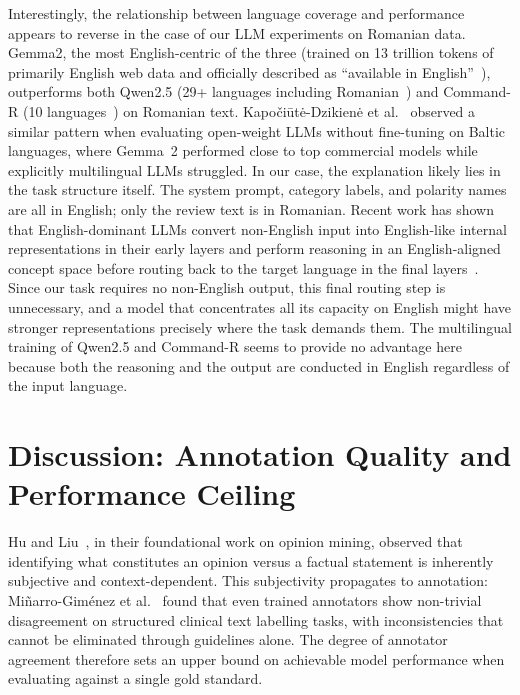 \documentclass[12pt,a4paper]{report}
\begin{document}
Interestingly, the relationship between language coverage and performance appears to reverse in the case
of our LLM experiments on Romanian data. 
Gemma2, the most English-centric of the three (trained on 13 trillion tokens of primarily English web 
data and officially described as ``available in English''~\cite{team2024gemma}), outperforms both Qwen2.5 
(29+ languages including Romanian~\cite{hui2024qwen2}) and Command-R (10 languages~\cite{cohere2024commandr}) 
on Romanian text. Kapo\v{c}i\={u}t\.{e}-Dzikien\.{e} et al.~\cite{kapociute2025baltic} observed a similar 
pattern when evaluating open-weight LLMs without fine-tuning on Baltic languages, where Gemma~2 performed 
close to top commercial models while explicitly multilingual LLMs struggled. In our case, the explanation 
likely lies in the task structure itself. The system prompt, category labels, and polarity names are all 
in English; only the review text is in Romanian. Recent work has shown that English-dominant LLMs convert 
non-English input into English-like internal representations in their early layers and perform reasoning 
in an English-aligned concept space before routing back to the target language in the final 
layers~\cite{wendler2024llamas, zhao2024multilingualism, schut2025multilingual}. Since our task requires 
no non-English output, this final routing step is unnecessary, and a model that concentrates all its 
capacity on English might have stronger representations precisely where the task demands them. 
The multilingual training of Qwen2.5 and Command-R seems to provide no advantage here because both the 
reasoning and the output are conducted in English regardless of the input language.


\section{Discussion: Annotation Quality and Performance Ceiling}\label{sec:annotation}

Hu and Liu~\cite{hu2004mining}, in their foundational work on opinion mining, observed that identifying what constitutes an opinion versus a factual statement is inherently subjective and context-dependent. This subjectivity propagates to annotation: Miñarro-Giménez et al.~\cite{minarro2018qualitative} found that even trained annotators show non-trivial disagreement on structured clinical text labelling tasks, with inconsistencies that cannot be eliminated through guidelines alone. The degree of annotator agreement therefore sets an upper bound on achievable model performance when evaluating against a single gold standard.
\end{document}
